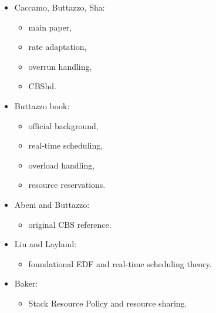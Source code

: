 \documentclass[a4paper,11pt]{article}
\begin{document}
\begin{itemize}
    \item Caccamo, Buttazzo, Sha:
    \begin{itemize}
        \item main paper,
        \item rate adaptation,
        \item overrun handling,
        \item CBShd.
    \end{itemize}
    \item Buttazzo book:
    \begin{itemize}
        \item official background,
        \item real-time scheduling,
        \item overload handling,
        \item resource reservations.
    \end{itemize}
    \item Abeni and Buttazzo:
    \begin{itemize}
        \item original CBS reference.
    \end{itemize}
    \item Liu and Layland:
    \begin{itemize}
        \item foundational EDF and real-time scheduling theory.
    \end{itemize}
    \item Baker:
    \begin{itemize}
        \item Stack Resource Policy and resource sharing.
    \end{itemize}
\end{itemize}
\end{document}
